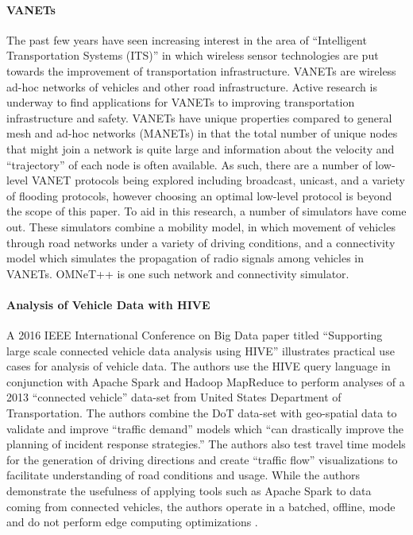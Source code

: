 \documentclass{thesis}
\begin{document}
        \paragraph{VANETs}
            The past few years have seen increasing interest in the area of ``Intelligent Transportation
            Systems (ITS)'' in which wireless sensor technologies are put towards the improvement of
            transportation infrastructure. VANETs are wireless ad-hoc networks of vehicles and other
            road infrastructure. Active research is underway to find applications for VANETs to improving
            transportation infrastructure and safety. 
            VANETs have unique properties compared to general mesh and ad-hoc networks (MANETs) in that
            the total number of unique nodes that might join a network is quite large and information
            about the velocity and ``trajectory'' of each node is often available.
            As such, there are a number of low-level VANET protocols being explored including broadcast,
            unicast, and a variety of flooding protocols, however choosing an optimal low-level protocol is 
            beyond the scope of this paper.
            To aid in this research, a number of simulators have
            come out. These simulators combine a mobility model, in which movement of vehicles through road
            networks under a variety of driving conditions, and a connectivity model which simulates the
            propagation of radio signals among vehicles in VANETs. OMNeT++ is one such network and connectivity
            simulator.
        \paragraph{Analysis of Vehicle Data with HIVE}
            A 2016 IEEE International Conference on Big Data paper titled ``Supporting large scale
            connected vehicle data analysis using HIVE'' illustrates practical use cases for analysis
            of vehicle data. The authors use the HIVE \cite{hive} query language in conjunction with Apache Spark
            \cite{spark} and Hadoop MapReduce \cite{hdfs}
            to perform analyses of a 2013 ``connected vehicle'' data-set from
            United States Department of Transportation. The authors combine the DoT data-set with
            geo-spatial data to validate and improve ``traffic demand'' models which ``can drastically
            improve the planning of incident response strategies.'' The authors also test travel
            time models for the generation of driving directions and create ``traffic flow'' visualizations
            to facilitate understanding of road conditions and usage. While the authors demonstrate the 
            usefulness of applying tools such as Apache Spark to data coming from connected vehicles, the
            authors operate in a batched, offline, mode and do not perform edge computing optimizations \cite{cv:hive}.
\end{document}
